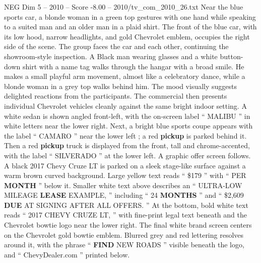 \begin{textsample}{NEG Dim 5 – 2010 – Score -8.00 – 2010/tv\_com\_2010\_26.txt}
Near the blue sports car, a blonde woman in a green top gestures with one hand while speaking to a suited man and an older man in a plaid shirt.
The front of the blue car, with its low hood, narrow headlights, and gold Chevrolet emblem, occupies the right side of the scene.
The group faces the car and each other, continuing the showroom-style inspection.
A Black man wearing glasses and a white button-down shirt with a name tag walks through the hangar with a broad smile.
He makes a small playful arm movement, almost like a celebratory dance, while a blonde woman in a grey top walks behind him.
The mood visually suggests delighted reactions from the participants.
The commercial then presents individual Chevrolet vehicles cleanly against the same bright indoor setting.
A white sedan is shown angled front-left, with the on-screen label “ MALIBU ” in white letters near the lower right.
Next, a bright blue sports coupe appears with the label “ CAMARO ” near the lower left ; a red \textbf{pickup} is parked behind it.
Then a red \textbf{pickup} truck is displayed from the front, tall and chrome-accented, with the label “ SILVERADO ” at the lower left.
A graphic offer screen follows.
A black 2017 Chevy Cruze LT is parked on a sleek stage-like surface against a warm brown curved background.
Large yellow text reads “ \$179 ” with “ PER \textbf{MONTH} ” below it.
Smaller white text above describes an “ ULTRA-LOW MILEAGE \textbf{LEASE} EXAMPLE, ” including “ 24 \textbf{MONTHS} ” and “ \$2,609 \textbf{DUE} AT SIGNING AFTER ALL OFFERS. ” At the bottom, bold white text reads “ 2017 CHEVY CRUZE LT, ” with fine-print legal text beneath and the Chevrolet bowtie logo near the lower right.
The final white brand screen centers on the Chevrolet gold bowtie emblem.
Blurred grey and red lettering resolves around it, with the phrase “ \textbf{FIND} NEW ROADS ” visible beneath the logo, and “ ChevyDealer.com ” printed below.

\end{textsample}
